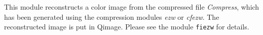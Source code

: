 This module reconstructs a color image from the compressed file 
{\em Compress}, which has been generated using the compression modules 
{\em ezw} or {\em cfezw}. The reconstructed image is put in Qimage. 
Please see the module \verb+fiezw+ for details.